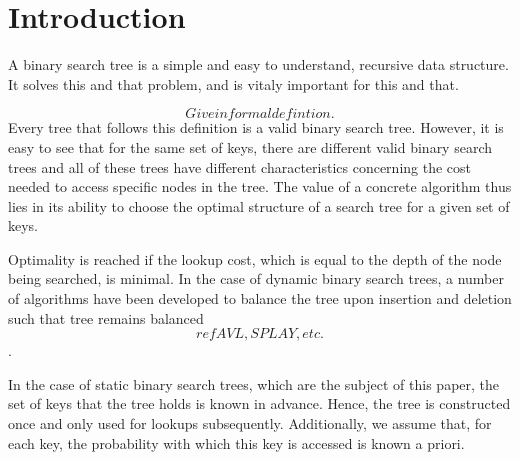 
\section{Introduction}\label{sec:intro}
A binary search tree is a simple and easy to understand, recursive data
structure. It solves this and that problem, and is vitaly important for this and
that. 

\[Give informal defintion.\] Every tree that follows this definition is a valid
binary search tree. However, it is easy to see that for the same set of keys,
there are different valid binary search trees and all of these trees have
different characteristics concerning the cost needed to access specific nodes in
the tree. The value of a concrete algorithm thus lies in its ability to choose
the optimal structure of a search tree for a given set of keys.

Optimality is reached if the lookup cost, which is equal to the depth of the
node being searched, is minimal. In the case of dynamic binary search trees, a
number of algorithms have been developed to balance the tree upon insertion and
deletion such that tree remains balanced \[ref AVL, SPLAY, etc.\].

In the case of static binary search trees, which are the subject of this paper,
the set of keys that the tree holds is known in advance. Hence, the tree is
constructed once and only used for lookups subsequently. Additionally, we assume
that, for each key, the probability with which this key is accessed is known a
priori.

